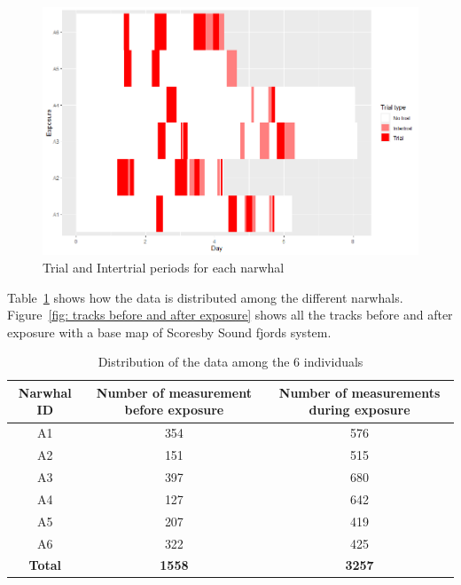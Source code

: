 \documentclass[11pt]{article}
\newcommand {\1}{\mathbb{1}}
\theoremstyle{definition}
\theoremstyle{remark}
\theoremstyle{remark}
\begin{document}
	\begin{figure}[H]
		\centering
			\centering
			\includegraphics[scale=0.5]{images/data_exploration/trials.png}
			\caption{Trial and Intertrial periods for each narwhal}
			\label{fig: trials and intertrials distributions}
		
	\end{figure}
 
 Table~\ref{table: data distribution}  shows how the data is distributed among the different narwhals. Figure~\ref{fig: tracks before and after exposure} shows all the tracks before and after exposure with a base map of Scoresby Sound fjords system.

\begin{table}[H]
	\centering
	\begin{tabular}{|c|c|c|}
		\hline
		Narwhal ID & Number of measurement before exposure & Number of measurements during exposure \\
		\hline
		A1 & 354 & 576\\
		\hline
		A2  & 151 & 515 \\
		\hline
		A3 & 397 & 680 \\
		\hline
		A4 & 127 & 642  \\
		\hline
		A5 & 207 & 419\\
		\hline
		A6 & 322 & 425 \\
		\hline
		\textbf{Total} & \textbf{1558} & \textbf{3257} \\
		\hline
	\end{tabular}
	\caption{Distribution of the data among the 6 individuals}
	\label{table: data distribution}
\end{table}
\end{document}
